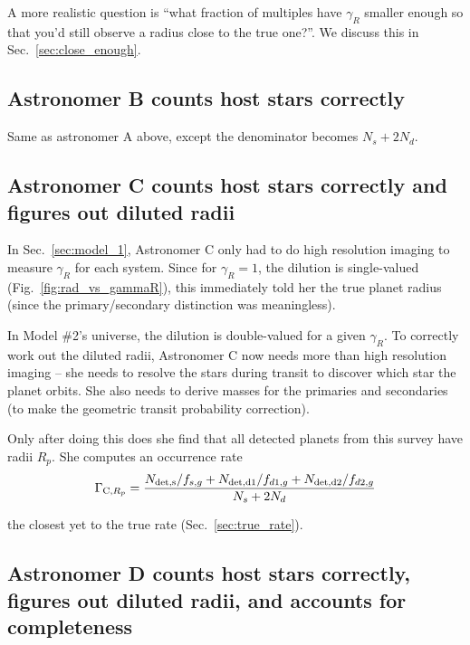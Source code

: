 \documentclass{emulateapj}
\begin{document}
A more realistic question is ``what fraction of multiples have $\gamma_R$ 
smaller enough so that you'd still observe a radius close to the true one?''. 
We discuss this in Sec.~\ref{sec:close_enough}.

\subsection{Astronomer B counts host stars correctly}

Same as astronomer A above, except the denominator becomes $N_s + 2N_d$.

\subsection{Astronomer C counts host stars correctly and figures out diluted
radii}

In Sec.~\ref{sec:model_1}, Astronomer C only had to do high resolution 
imaging to measure $\gamma_R$ for each system. Since for $\gamma_R = 1$, the 
dilution is single-valued (Fig.~\ref{fig:rad_vs_gammaR}), this immediately 
told her the true planet radius (since the primary/secondary distinction was 
meaningless).

In Model \#2's universe, the dilution is double-valued for a given $\gamma_R$.
To correctly work out the diluted radii, Astronomer C now needs more than high 
resolution imaging -- she needs to resolve the stars during transit to 
discover which star the planet orbits.
She also needs to derive masses for the primaries and secondaries (to make the 
geometric transit probability correction).

Only after doing this does she find that all detected planets from this survey 
have radii $R_p$. She computes an occurrence rate
\begin{equation}
	\Gamma_{{\rm C},R_p} = 
	\frac
			{N_{\rm det,s}/f_{s,g} +
			  N_{\rm det,d1}/f_{d1,g} +
			  N_{\rm 	det,d2}/f_{d2,g}}
			{N_s + 2N_d}
\end{equation}

the closest yet to the true rate (Sec.~\ref{sec:true_rate}).


\subsection{Astronomer D counts host stars correctly, figures out diluted
radii, and accounts for completeness}
\end{document}
